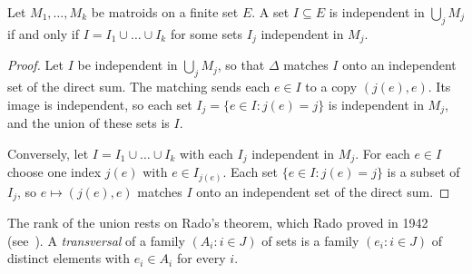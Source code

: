 \begin{lemma}
  \label{lem:union-indep-iff}
  \leanok
  Let $M_1, \dots, M_k$ be matroids on a finite set $E$. A set
  $I \subseteq E$ is independent in $\bigcup_j M_j$ if and only if
  $I = I_1 \cup \dots \cup I_k$ for some sets $I_j$ independent in
  $M_j$.
\end{lemma}
\begin{proof}
  \leanok
  Let $I$ be independent in $\bigcup_j M_j$, so that $\Delta$ matches
  $I$ onto an independent set of the direct sum. The matching sends each
  $e \in I$ to a copy $(j(e), e)$. Its image is independent, so each
  set $I_j = \{e \in I : j(e) = j\}$ is independent in $M_j$, and the
  union of these sets is $I$.

  Conversely, let $I = I_1 \cup \dots \cup I_k$ with each $I_j$
  independent in $M_j$. For each $e \in I$ choose one index $j(e)$ with
  $e \in I_{j(e)}$. Each set $\{e \in I : j(e) = j\}$ is a subset of
  $I_j$, so $e \mapsto (j(e), e)$ matches $I$ onto an independent set of
  the direct sum.
\end{proof}

The rank of the union rests on Rado's theorem, which Rado proved in 1942
(see~\cite[Theorem~11.2.2]{oxley2011}). A \emph{transversal} of a
family $(A_i : i \in J)$ of sets is a family $(e_i : i \in J)$ of
distinct elements with $e_i \in A_i$ for every $i$.

